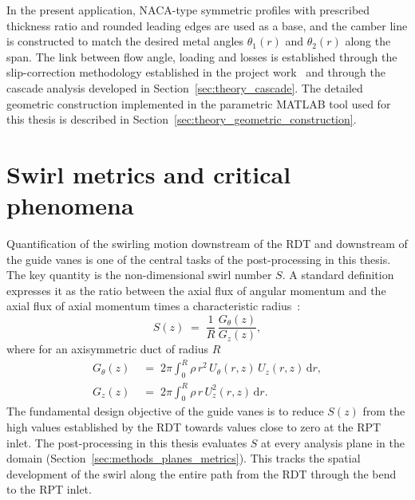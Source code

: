 In the present application, NACA-type symmetric profiles with prescribed thickness ratio and rounded leading edges are used as a base, and the camber line is constructed to match the desired metal angles $\theta_1(r)$ and $\theta_2(r)$ along the span. The link between flow angle, loading and losses is established through the slip-correction methodology established in the project work~\cite{Leonsen2025} and through the cascade analysis developed in Section~\ref{sec:theory_cascade}. The detailed geometric construction implemented in the parametric MATLAB tool used for this thesis is described in Section~\ref{sec:theory_geometric_construction}.
 
\section{Swirl metrics and critical phenomena}
\label{sec:theory_swirl_metrics_def}
 
Quantification of the swirling motion downstream of the RDT and downstream of the guide vanes is one of the central tasks of the post-processing in this thesis. The key quantity is the non-dimensional swirl number $S$. A standard definition expresses it as the ratio between the axial flux of angular momentum and the axial flux of axial momentum times a characteristic radius~\cite{Gupta1984, Vignat2022}:
\begin{equation}
S(z) \;=\; \frac{1}{R}\,\frac{G_\theta(z)}{G_z(z)},
\label{eq:S_def}
\end{equation}
where for an axisymmetric duct of radius $R$
\begin{align}
G_\theta(z) \;&=\; 2\pi\!\int_0^R \rho\, r^2 \, U_\theta(r,z)\,U_z(r,z)\,\mathrm{d}r,
\label{eq:Gtheta}\\
G_z(z) \;&=\; 2\pi\!\int_0^R \rho\, r \, U_z^{2}(r,z)\,\mathrm{d}r.
\label{eq:Gz}
\end{align}
The fundamental design objective of the guide vanes is to reduce $S(z)$ from the high values established by the RDT towards values close to zero at the RPT inlet. The post-processing in this thesis evaluates $S$ at every analysis plane in the domain (Section~\ref{sec:methods_planes_metrics}). This tracks the spatial development of the swirl along the entire path from the RDT through the bend to the RPT inlet.
 

